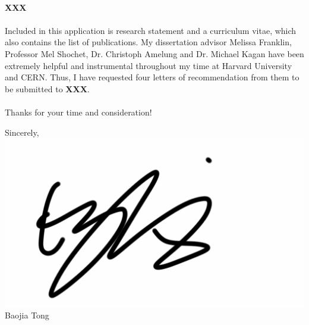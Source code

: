 \documentclass[letterpaper,11pt,oneside]{article}
\begin{document}
\paragraph{} 
\textbf{XXX}

\paragraph{}
Included in this application is research statement and a curriculum vitae, which also contains the list of publications. My dissertation advisor Melissa Franklin, Professor Mel Shochet, Dr. Christoph Amelung and Dr. Michael Kagan have been extremely helpful and instrumental throughout my time at Harvard University and CERN. Thus, I have requested four letters of recommendation from them to be submitted to \textbf{XXX}.

\paragraph{}
Thanks for your time and consideration!

\begin{flushright}
Sincerely, \\
\vspace{1em} 
\includegraphics[scale=0.1]{Signature} \\ %
\vspace{1em} 
Baojia Tong \\
\end{flushright}
\end{document}
